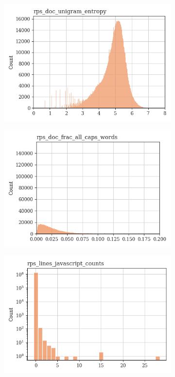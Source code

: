 \documentclass{article}
\begin{document}
\begin{figure}
\begin{subfigure}[b]{0.32\textwidth}
        \includegraphics[width=\textwidth]{figures/quality_signals/rps_doc_unigram_entropy.png}
    \end{subfigure}
    \hfill
    \begin{subfigure}[b]{0.32\textwidth}
        \centering
        \includegraphics[width=\textwidth]{figures/quality_signals/rps_doc_frac_all_caps_words.png}
    \end{subfigure}
    \begin{subfigure}[b]{0.32\textwidth}
        \centering
        \includegraphics[width=\textwidth]{figures/quality_signals/rps_lines_javascript_counts.png}

\end{subfigure}
\end{figure}
\end{document}
